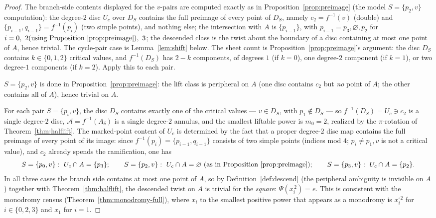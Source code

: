 \documentclass[11pt]{article}
\theoremstyle{definition}
\theoremstyle{remark}
\begin{document}
\begin{proof}
The branch-side contents displayed for the $v$-pairs are computed
exactly as in Proposition~\ref{prop:preimage} (the model
$S=\{p_2,v\}$ computation): the degree-$2$ disc
$U_c$ over $D_S$ contains the full preimage of every point of $D_S$,
namely $c_2=f^{-1}(v)$ (double) and $\{p_{i-1},q_{i-1}\}=f^{-1}(p_i)$
(two simple points), and nothing else; the intersection with $A$ is
$\{p_{i-1}\}$, with $p_{i-1}=p_3,\varnothing,p_2$ for
$i=0,\ 2(\text{using Proposition~\ref{prop:preimage}}),\ 3$; the
descended class is the twist about the boundary of a disc containing
at most one point of $A$, hence trivial.  The cycle-pair case is
Lemma~\ref{lem:shift} below.
The sheet count is Proposition~\ref{prop:preimage}'s argument: the
disc $D_S$ contains $k\in\{0,1,2\}$ critical values, and
$f^{-1}(D_S)$ has $2-k$ components, of degrees $1$ (if $k=0$), one
degree-$2$ component (if $k=1$), or two degree-$1$ components (if
$k=2$).  Apply this to each pair.

$S=\{p_2,v\}$ is done in Proposition~\ref{prop:preimage}: the lift
class is peripheral on $A$ (one disc contains $c_2$ but \emph{no} point
of $A$; the other contains all of $A$), hence trivial on $A$.

For each pair $S=\{p_i,v\}$, the disc $D_S$ contains exactly one of
the critical values — $v\in D_S$, with $p_1\notin D_S$ — so
$f^{-1}(D_S)=U_c\ni c_2$ is a single degree-$2$ disc,
$\mathscr A=f^{-1}(A_\delta)$ is a single degree-$2$ annulus, and the
smallest liftable power is $m_0=2$, realized by the $\pi$-rotation of
Theorem~\ref{thm:halflift}.  The marked-point content of $U_c$ is
determined by the fact that a proper degree-$2$ disc map contains the
full preimage of every point of its image: since
$f^{-1}(p_i)=\{p_{i-1},q_{i-1}\}$ consists of two simple points
(indices mod $4$; $p_i\ne p_1,v$ is not a critical value), and $c_2$
already spends the ramification, one has
\[
S=\{p_0,v\}:\ U_c\cap A=\{p_3\};\qquad
S=\{p_2,v\}:\ U_c\cap A=\varnothing\ (\text{as in
Proposition~\ref{prop:preimage}});\qquad
S=\{p_3,v\}:\ U_c\cap A=\{p_2\}.
\]
In all three cases the branch side contains at most one point of $A$,
so by Definition~\ref{def:descend} (the peripheral ambiguity is
invisible on $A$) together with Theorem~\ref{thm:halflift}, the
descended twist on $A$ is trivial for
the \emph{square}: $\Psi(x_i^{\,2})=e$.  This is consistent with the
monodromy census (Theorem~\ref{thm:monodromy-full}), where $x_i$ to the
smallest positive power that appears as a monodromy is $x_i^{\circ2}$
for $i\in\{0,2,3\}$ and $x_1$ for $i=1$.


\end{proof}
\end{document}
